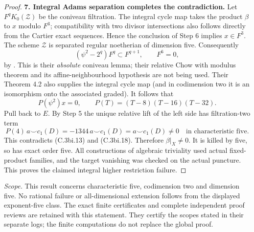 \begin{proof}
\textbf{7. Integral Adams separation completes the contradiction.}
Let $F^qK_0(\mathcal Z)$ be the coniveau filtration. The integral
cycle map takes the product $\beta$ to $x$ modulo $F^3$; compatibility
with two divisor intersections also follows directly from the Cartier
exact sequences. Hence the conclusion of Step 6 implies $x\in F^3$.
The scheme $\mathcal Z$ is separated regular noetherian of dimension
five. Consequently
\[
 (\psi^2-2^q)F^q\subset F^{q+1},\qquad F^6=0,
\]
by \citet[Lemma 3.10 and Proposition 3.4]{D_IwasaKai2021}.
This is their \emph{absolute} coniveau lemma; their relative Chow
with modulus theorem and its affine-neighbourhood hypothesis are not
being used. Their Theorem 4.2 also supplies the integral cycle map
(and in codimension two it is an isomorphism onto the associated
graded). It follows that
\[
 P(\psi^2)x=0,\qquad P(T)=(T-8)(T-16)(T-32).
 \tag{C.3bi.18}
\]
Pull back to $E$. By Step 5 the unique relative lift of the left
side has filtration-two term
\[
 P(4)\,a\smile c_1(D)=-1344\,a\smile c_1(D)
                 =a\smile c_1(D)\ne0
 \quad\text{in characteristic five}.
\]
This contradicts (C.3bi.13) and (C.3bi.18). Therefore
$\beta|_X\ne0$. It is killed by five, so has exact order five.
All constructions of algebraic triviality used actual fixed-product
families, and the target vanishing was checked on the actual puncture.
This proves the claimed integral higher restriction failure.
\end{proof}

\noindent\emph{Scope.} This result concerns characteristic five,
codimension two and dimension five. No rational failure or
all-dimensional extension follows from the displayed exponent-five
class. The exact finite certificates and complete independent proof reviews
are retained with this statement. They certify the scopes stated in
their separate logs; the finite computations do not replace the
global proof.
